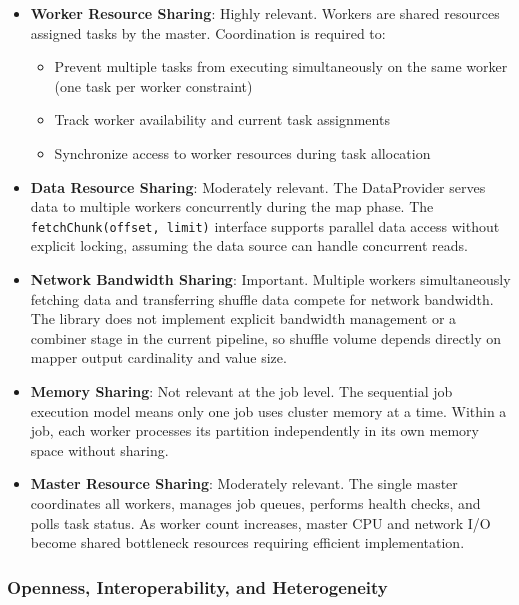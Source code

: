 \documentclass{scrartcl}
\begin{document}
\begin{itemize}
    \item \textbf{Worker Resource Sharing}: Highly relevant. Workers are shared resources assigned tasks by the master. Coordination is required to:
          \begin{itemize}
              \item Prevent multiple tasks from executing simultaneously on the same worker (one task per worker constraint)
              \item Track worker availability and current task assignments
              \item Synchronize access to worker resources during task allocation
          \end{itemize}

    \item \textbf{Data Resource Sharing}: Moderately relevant. The DataProvider serves data to multiple workers concurrently during the map phase. The \texttt{fetchChunk(offset, limit)} interface supports parallel data access without explicit locking, assuming the data source can handle concurrent reads.

    \item \textbf{Network Bandwidth Sharing}: Important. Multiple workers simultaneously fetching data and transferring shuffle data compete for network bandwidth. The library does not implement explicit bandwidth management or a combiner stage in the current pipeline, so shuffle volume depends directly on mapper output cardinality and value size.

    \item \textbf{Memory Sharing}: Not relevant at the job level. The sequential job execution model means only one job uses cluster memory at a time. Within a job, each worker processes its partition independently in its own memory space without sharing.

    \item \textbf{Master Resource Sharing}: Moderately relevant. The single master coordinates all workers, manages job queues, performs health checks, and polls task status. As worker count increases, master CPU and network I/O become shared bottleneck resources requiring efficient implementation.
\end{itemize}

\subsubsection{Openness, Interoperability, and Heterogeneity}
\end{document}
